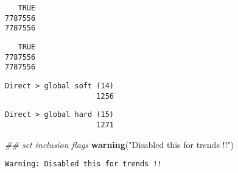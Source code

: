 \documentclass[
  10pt,
  a4paper,oneside]{article}
\newenvironment{Shaded}{\begin{snugshade}}{\end{snugshade}}
\newcommand{\AlertTok}[1]{\textcolor[rgb]{0.94,0.16,0.16}{#1}}
\newcommand{\CommentTok}[1]{\textcolor[rgb]{0.56,0.35,0.01}{\textit{#1}}}
\newcommand{\DecValTok}[1]{\textcolor[rgb]{0.00,0.00,0.81}{#1}}
\newcommand{\KeywordTok}[1]{\textcolor[rgb]{0.13,0.29,0.53}{\textbf{#1}}}
\newcommand{\NormalTok}[1]{#1}
\newcommand{\OperatorTok}[1]{\textcolor[rgb]{0.81,0.36,0.00}{\textbf{#1}}}
\newcommand{\StringTok}[1]{\textcolor[rgb]{0.31,0.60,0.02}{#1}}
\begin{document}
\begin{verbatim}
   TRUE 
7787556 
7787556
\end{verbatim}

\begin{Shaded}
\end{Shaded}

\begin{verbatim}
   TRUE 
7787556 
7787556
\end{verbatim}

\begin{Shaded}
\end{Shaded}

\begin{verbatim}
Direct > global soft (14) 
                     1256 
\end{verbatim}

\begin{Shaded}
\end{Shaded}

\begin{verbatim}
Direct > global hard (15) 
                     1271 
\end{verbatim}

\begin{Shaded}
\begin{Highlighting}[]
\CommentTok{\#\# set inclusion flags}
\KeywordTok{warning}\NormalTok{(}\StringTok{"Disabled this for trends !!"}\NormalTok{)}
\end{Highlighting}
\end{Shaded}

\begin{verbatim}
Warning: Disabled this for trends !!
\end{verbatim}
\end{document}
